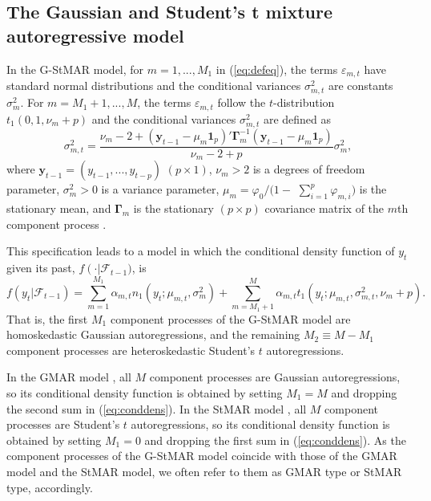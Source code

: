 \documentclass[nojss]{jss} %
\begin{document}
\subsection{The Gaussian and Student's t mixture autoregressive model}\label{sec:gstmar}
In the G-StMAR model, for $m=1,...,M_1$ in (\ref{eq:defeq}), the terms $\varepsilon_{m,t}$ have standard normal distributions and the conditional variances $\sigma_{m,t}^2$ are constants $\sigma_m^2$. For $m=M_1+1,...,M$, the terms $\varepsilon_{m,t}$ follow the $t$-distribution $t_1(0,1,\nu_m+p)$ and the conditional variances $\sigma_{m,t}^2$ are defined as
%
\begin{equation}\label{eq:sigmamt}
\sigma_{m,t}^2=\frac{\nu_m-2+(\boldsymbol{y}_{t-1}-\mu_m\mathbf{1}_p)'\boldsymbol{\Gamma}_m^{-1}(\boldsymbol{y}_{t-1}-\mu_m\mathbf{1}_p)}{\nu_m-2+p}\sigma_m^2,
\end{equation}
%
where $\boldsymbol{y}_{t-1}=(y_{t-1},...,y_{t-p})$ $(p \times 1)$, $\nu_m>2$ is a degrees of freedom parameter, $\sigma_m^2>0$ is a variance parameter, $\mu_m=\varphi_0/ (1-$ $\sum_{i=1}^p\varphi_{m,i})$ is the stationary mean, and $\boldsymbol{\Gamma}_m$ is the stationary $(p\times p)$ covariance matrix of the $m$th component process \cite[see][Section 2.1]{Virolainen:2020}.

This specification leads to a model in which the conditional density function of $y_t$ given its past, $f\left(\cdot \right | \mathcal{F}_{t-1})$, is
%
\begin{equation}\label{eq:conddens}
f\left(y_t |\mathcal{F}_{t-1}\right)=\sum_{m=1}^{M_1}\alpha_{m,t}n_1(y_t;\mu_{m,t},\sigma_m^2)+\sum_{m=M_1+1}^{M}\alpha_{m,t} t_1\left(y_t;\mu_{m,t},\sigma_{m,t}^2,\nu_m+p\right).
\end{equation}
%
That is, the first $M_1$ component processes of the G-StMAR model are homoskedastic Gaussian autoregressions, and the remaining $M_2\equiv M - M_1$ component processes are heteroskedastic Student's $t$ autoregressions.

In the GMAR model \citep{Kalliovirta+Meitz+Saikkonen:2015}, all $M$ component processes are Gaussian autoregressions, so its conditional density function is obtained by setting $M_1=M$ and dropping the second sum in (\ref{eq:conddens}). In the StMAR model \citep{Meitz+Preve+Saikkonen:2021}, all $M$ component processes are Student's $t$ autoregressions, so its conditional density function is obtained by setting $M_1=0$ and dropping the first sum in (\ref{eq:conddens}). As the component processes of the G-StMAR model coincide with those of the GMAR model and the StMAR model, we often refer to them as GMAR type or StMAR type, accordingly.
\end{document}
